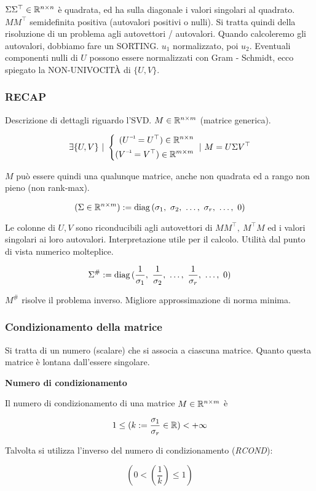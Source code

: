 $\Sigma\Sigma^\top\in\mathbb{R}^{n\times n}$ è quadrata, ed ha sulla diagonale i valori singolari al quadrato. $MM^\top$ semidefinita positiva (autovalori positivi o nulli). Si tratta quindi della risoluzione di un problema agli autovettori / autovalori. Quando calcoleremo gli autovalori, dobbiamo fare un SORTING. $u_1$ normalizzato, poi $u_2$. Eventuali componenti nulli di $U$ possono essere normalizzati con Gram - Schmidt, ecco spiegato la NON-UNIVOCIT\`A di $\{U,V\}$.

\subsubsection{RECAP}

Descrizione di dettagli riguardo l'SVD. $M\in\mathbb{R}^{n\times m}$ (matrice generica). 

\[
	\exists \{U,V\}\ |\ \left\{\begin{aligned}(\inv{U}=U^\top)\in\R^{n\times n}\\(\inv{V}=V^\top)\in\R^{m\times m}\end{aligned}\right.\ |\ M=U\Sigma V^\top
\]

$M$ può essere quindi una qualunque matrice, anche non quadrata ed a rango non pieno (non rank-max). 

\[
	(\Sigma\in\mathbb{R}^{n\times m}) := \operatorname{diag}{(\sigma_1,\ \sigma_2,\ \dots,\ \sigma_r,\ \dots,\ 0)}
\]

Le colonne di $U,V$ sono riconducibili agli autovettori di $MM^\top,\ M^\top M$ ed i valori singolari ai loro autovalori. Interpretazione utile per il calcolo. Utilità dal punto di vista numerico molteplice.

\[
	\Sigma^\# := \diag{(\frac{1}{\sigma_1},\ \frac{1}{\sigma_2},\ \dots,\ \frac{1}{\sigma_r},\ \dots,\ 0)}
\]

$M^\#$ risolve il problema inverso. Migliore approssimazione di norma minima.

\subsubsection{Condizionamento della matrice}

Si tratta di un numero (scalare) che si associa a ciascuna matrice. Quanto questa matrice è lontana dall'essere singolare.

\begin{defn}{\textbf{Numero di condizionamento}}

Il numero di condizionamento di una matrice $M\in\mathbb{R}^{n\times m}$ è

\[
	1\leq(k := \frac{\sigma_1}{\sigma_r}\in\mathbb{R}) < +\infty
\]

Talvolta si utilizza l'inverso del numero di condizionamento (\textit{RCOND}):

\[
	(0<(\frac{1}{k})\leq 1)
\]

\end{defn}

